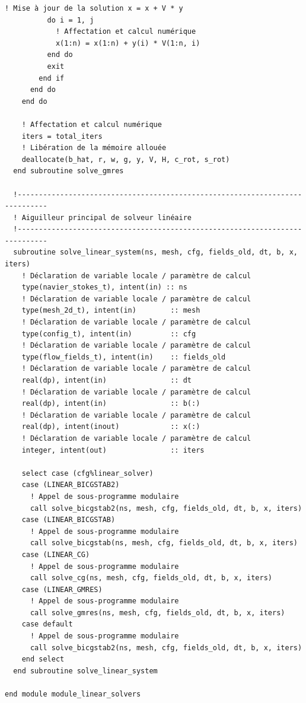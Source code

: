 \documentclass[10pt,a4paper,oneside]{book}
\begin{document}
\begin{lstlisting}[language={[95]Fortran}]
          ! Mise à jour de la solution x = x + V * y
          do i = 1, j
            ! Affectation et calcul numérique
            x(1:n) = x(1:n) + y(i) * V(1:n, i)
          end do
          exit
        end if
      end do
    end do

    ! Affectation et calcul numérique
    iters = total_iters
    ! Libération de la mémoire allouée
    deallocate(b_hat, r, w, g, y, V, H, c_rot, s_rot)
  end subroutine solve_gmres

  !-----------------------------------------------------------------------------
  ! Aiguilleur principal de solveur linéaire
  !-----------------------------------------------------------------------------
  subroutine solve_linear_system(ns, mesh, cfg, fields_old, dt, b, x, iters)
    ! Déclaration de variable locale / paramètre de calcul
    type(navier_stokes_t), intent(in) :: ns
    ! Déclaration de variable locale / paramètre de calcul
    type(mesh_2d_t), intent(in)        :: mesh
    ! Déclaration de variable locale / paramètre de calcul
    type(config_t), intent(in)         :: cfg
    ! Déclaration de variable locale / paramètre de calcul
    type(flow_fields_t), intent(in)    :: fields_old
    ! Déclaration de variable locale / paramètre de calcul
    real(dp), intent(in)               :: dt
    ! Déclaration de variable locale / paramètre de calcul
    real(dp), intent(in)               :: b(:)
    ! Déclaration de variable locale / paramètre de calcul
    real(dp), intent(inout)            :: x(:)
    ! Déclaration de variable locale / paramètre de calcul
    integer, intent(out)               :: iters

    select case (cfg%linear_solver)
    case (LINEAR_BICGSTAB2)
      ! Appel de sous-programme modulaire
      call solve_bicgstab2(ns, mesh, cfg, fields_old, dt, b, x, iters)
    case (LINEAR_BICGSTAB)
      ! Appel de sous-programme modulaire
      call solve_bicgstab(ns, mesh, cfg, fields_old, dt, b, x, iters)
    case (LINEAR_CG)
      ! Appel de sous-programme modulaire
      call solve_cg(ns, mesh, cfg, fields_old, dt, b, x, iters)
    case (LINEAR_GMRES)
      ! Appel de sous-programme modulaire
      call solve_gmres(ns, mesh, cfg, fields_old, dt, b, x, iters)
    case default
      ! Appel de sous-programme modulaire
      call solve_bicgstab2(ns, mesh, cfg, fields_old, dt, b, x, iters)
    end select
  end subroutine solve_linear_system

end module module_linear_solvers

\end{lstlisting}
\end{document}
